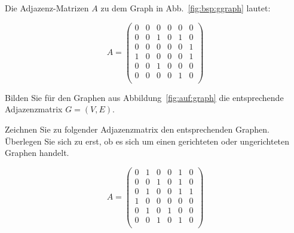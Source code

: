 \begin{mbsp}
Die Adjazenz-Matrizen $A$ zu dem Graph in Abb.~\ref{fig:bsp:ggraph} lautet:

\[ 
A =  \begin{pmatrix}
  0 & 0 & 0 & 0 & 0 & 0 \\
  0 & 0 & 1 & 0 & 1 & 0 \\
  0 & 0 & 0 & 0 & 0 & 1 \\
  1 & 0 & 0 & 0 & 0 & 1 \\
  0 & 0 & 1 & 0 & 0 & 0 \\
  0 & 0 & 0 & 0 & 1 & 0 \\
 \end{pmatrix}
  \]
\end{mbsp}

\begin{aufg}
Bilden Sie für den Graphen aus Abbildung~\ref{fig:auf:graph} die entsprechende Adjazenzmatrix $G=(V,E)$.
\end{aufg}



\begin{aufg}
Zeichnen Sie zu folgender Adjazenzmatrix den entsprechenden Graphen.
Überlegen Sie sich zu erst, ob es sich um einen gerichteten oder ungerichteten Graphen handelt.


\[A =  \begin{pmatrix}
  0 & 1 & 0 & 0 & 1 & 0 \\
  0 & 0 & 1 & 0 & 1 & 0 \\
  0 & 1 & 0 & 0 & 1 & 1 \\
  1 & 0 & 0 & 0 & 0 & 0 \\
  0 & 1 & 0 & 1 & 0 & 0 \\
  0 & 0 & 1 & 0 & 1 & 0 \\
 \end{pmatrix}
  \]
  
\end{aufg}

